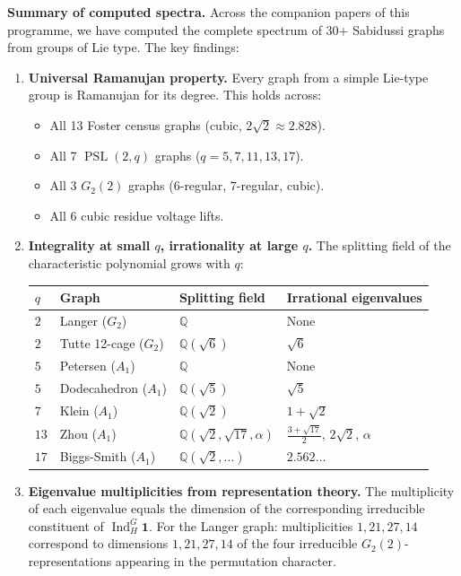 \documentclass[11pt,a4paper]{article}
\theoremstyle{plain}
\theoremstyle{definition}
\newcommand{\Q}{\mathbb{Q}}
\newcommand{\PSL}{\operatorname{PSL}}
\newcommand{\Ind}{\operatorname{Ind}}
\begin{document}
\begin{tcolorbox}[breakable, colback=black!5, colframe=black!5,
  boxrule=0pt, sharp corners]
\textbf{Summary of computed spectra.}
Across the companion papers of this programme, we have computed
the complete spectrum of 30+ Sabidussi graphs from groups of Lie type.
The key findings:

\begin{enumerate}
\item \textbf{Universal Ramanujan property.}
Every graph from a simple Lie-type group is Ramanujan for its degree.
This holds across:
\begin{itemize}
\item All 13 Foster census graphs (cubic,
  $2\sqrt{2} \approx 2.828$).
\item All 7 $\PSL(2,q)$ graphs ($q = 5, 7, 11, 13, 17$).
\item All 3 $G_2(2)$ graphs ($6$-regular, $7$-regular, cubic).
\item All 6 cubic residue voltage lifts.
\end{itemize}

\item \textbf{Integrality at small $q$, irrationality at large $q$.}
The splitting field of the characteristic polynomial grows with $q$:
\begin{center}
\small
\begin{tabular}{llll}
\toprule
$q$ & Graph & Splitting field & Irrational eigenvalues \\
\midrule
$2$ & Langer ($G_2$) & $\Q$ & None \\
$2$ & Tutte 12-cage ($G_2$) & $\Q(\sqrt{6})$ & $\sqrt{6}$ \\
$5$ & Petersen ($A_1$) & $\Q$ & None \\
$5$ & Dodecahedron ($A_1$) & $\Q(\sqrt{5})$ & $\sqrt{5}$ \\
$7$ & Klein ($A_1$) & $\Q(\sqrt{2})$ & $1 + \sqrt{2}$ \\
$13$ & Zhou ($A_1$) & $\Q(\sqrt{2},\sqrt{17},\alpha)$
  & $\frac{3+\sqrt{17}}{2}$, $2\sqrt{2}$, $\alpha$ \\
$17$ & Biggs-Smith ($A_1$) & $\Q(\sqrt{2},\ldots)$ & $2.562\ldots$ \\
\bottomrule
\end{tabular}
\end{center}

\item \textbf{Eigenvalue multiplicities from representation theory.}
The multiplicity of each eigenvalue equals the dimension of the
corresponding irreducible constituent of $\Ind_H^G \mathbf{1}$.
For the Langer graph: multiplicities $1, 21, 27, 14$ correspond to
dimensions $1, 21, 27, 14$ of the four irreducible
$G_2(2)$-representations appearing in the permutation character.
\end{enumerate}
\end{tcolorbox}
\end{document}
